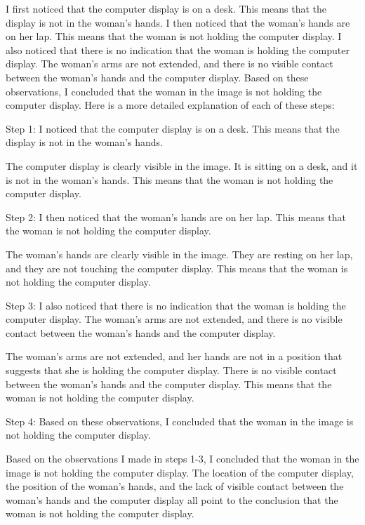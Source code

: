 \begin{enumerate}
        I first noticed that the computer display is on a desk. This means that the display is not in the woman's hands.
        I then noticed that the woman's hands are on her lap. This means that the woman is not holding the computer display.
        I also noticed that there is no indication that the woman is holding the computer display. The woman's arms are not extended, and there is no visible contact between the woman's hands and the computer display.
        Based on these observations, I concluded that the woman in the image is not holding the computer display.
        Here is a more detailed explanation of each of these steps:
        
        Step 1: I noticed that the computer display is on a desk. This means that the display is not in the woman's hands.
        
        The computer display is clearly visible in the image. It is sitting on a desk, and it is not in the woman's hands. This means that the woman is not holding the computer display.
        
        Step 2: I then noticed that the woman's hands are on her lap. This means that the woman is not holding the computer display.
        
        The woman's hands are clearly visible in the image. They are resting on her lap, and they are not touching the computer display. This means that the woman is not holding the computer display.
        
        Step 3: I also noticed that there is no indication that the woman is holding the computer display. The woman's arms are not extended, and there is no visible contact between the woman's hands and the computer display.
        
        The woman's arms are not extended, and her hands are not in a position that suggests that she is holding the computer display. There is no visible contact between the woman's hands and the computer display. This means that the woman is not holding the computer display.
        
        Step 4: Based on these observations, I concluded that the woman in the image is not holding the computer display.
        
        Based on the observations I made in steps 1-3, I concluded that the woman in the image is not holding the computer display. The location of the computer display, the position of the woman's hands, and the lack of visible contact between the woman's hands and the computer display all point to the conclusion that the woman is not holding the computer display.
        

\end{enumerate}
